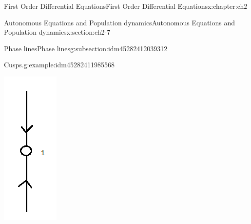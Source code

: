 \documentclass[oneside,10pt,]{book}
\numberwithin{equation}{section}
\numberwithin{equation}{section}
\begin{document}
\begin{chapterptx}{First Order Differential Equations}{}{First Order Differential Equations}{}{}{x:chapter:ch2}
\begin{sectionptx}{Autonomous Equations and Population dynamics}{}{Autonomous Equations and Population dynamics}{}{}{x:section:ch2-7}
\begin{subsectionptx}{Phase lines}{}{Phase lines}{}{}{g:subsection:idm45282412039312}
\begin{example}{Cusps.}{g:example:idm45282411985568}
\begin{image}{0}{1}{0}
\includegraphics[width=\linewidth]{images/1.6-Phase3.png}

\end{image}
\end{example}
\end{subsectionptx}
\end{sectionptx}
\end{chapterptx}
\end{document}
